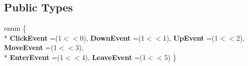 \subsection*{Public Types}
\begin{DoxyCompactItemize}
\item 
enum \{ \\*
{\bfseries Click\+Event} =(1$<$$<$0), 
{\bfseries Down\+Event} =(1$<$$<$1), 
{\bfseries Up\+Event} =(1$<$$<$2), 
{\bfseries Move\+Event} =(1$<$$<$3), 
\\*
{\bfseries Enter\+Event} =(1$<$$<$4), 
{\bfseries Leave\+Event} =(1$<$$<$5)
 \}\hypertarget{classBaseInterface_1_1Room_1_1Link_aaba9d0534ab895e93f7a750df24a64d9}{}\label{classBaseInterface_1_1Room_1_1Link_aaba9d0534ab895e93f7a750df24a64d9}

\end{DoxyCompactItemize}
